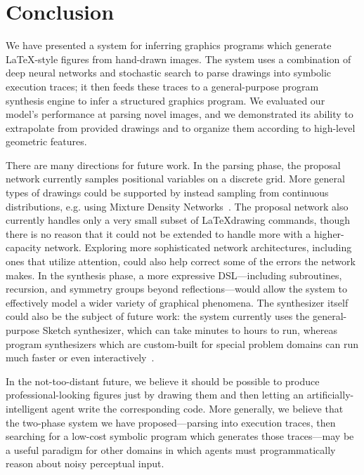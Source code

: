 \documentclass{article}
\begin{document}
\section{Conclusion}

We have presented a system for inferring graphics programs which generate \LaTeX-style figures from hand-drawn images. The system uses a combination of deep neural networks and stochastic search to parse drawings into symbolic execution traces; it then feeds these traces to a general-purpose program synthesis engine to infer a structured graphics program. We evaluated our model's performance at parsing novel images, and we demonstrated its ability to extrapolate from provided drawings and to organize them according to high-level geometric features.

There are many directions for future work. In the parsing phase, the proposal network currently samples positional variables on a discrete grid. More general types of drawings could be supported by instead sampling from continuous distributions, e.g. using Mixture Density Networks~\cite{MDN}. The proposal network also currently handles only a very small subset of \LaTeX drawing commands, though there is no reason that it could not be extended to handle more with a higher-capacity network. Exploring more sophisticated network architectures, including ones that utilize attention, could also help correct some of the errors the network makes.
In the synthesis phase, a more expressive DSL---including subroutines, recursion, and symmetry groups beyond reflections---would allow the system to effectively model a wider variety of graphical phenomena. The synthesizer itself could also be the subject of future work: the system currently uses the general-purpose Sketch synthesizer, which can take minutes to hours to run, whereas program synthesizers which are custom-built for special problem domains can run much faster or even interactively~\cite{le2014flashextract}.

In the not-too-distant future, we believe it should be possible to produce professional-looking figures just by drawing them and then letting an artificially-intelligent agent write the corresponding code.
More generally, we believe that the two-phase system we have proposed---parsing into execution traces, then searching for a low-cost symbolic program which generates those traces---may be a useful paradigm for other domains in which agents must programmatically reason about noisy perceptual input.



%



{\small }
\end{document}
